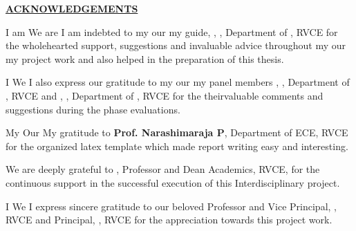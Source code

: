 \thispagestyle{empty}
\ifIDP \vspace{-1cm}\fi
\begin{center}
	\Large\textbf{\underline{ACKNOWLEDGEMENTS}} \par
\end{center}

\ifPG I am \else
\ifStuNameBUsed We are \else I am \fi\fi indebted to \ifPG my \else\ifStuNameBUsed our \else my \fi\fi guide, \textbf{\printGuideNameA}, \printGuideDesigA, Department of \printGuideDeptAInSF, RVCE for the wholehearted support, suggestions and invaluable advice throughout \ifPG my \else\ifStuNameBUsed our \else my \fi\fi project work and also helped in the preparation of this thesis.\\ \par

\ifPG I \else \ifStuNameBUsed We \else I \fi\fi also express our gratitude to \ifPG my \else\ifStuNameBUsed our \else my \fi\fi  panel member\ifIDP\space\else s \fi\textbf{\printPanelMemberA}, \printPanelMemberDesigA, Department of \printPanelMemberDeptAInSF, RVCE \ifIDP \else and \textbf{\printPanelMemberB}, \printPanelMemberDesigB , Department of \printPanelMemberDeptBInSF, RVCE \fi for \ifPanelMemBUsed the \else their\fi valuable comments and suggestions during the phase evaluations. \\ \par

\ifPG My \else \ifStuNameBUsed Our \else My \fi\fi gratitude to \textbf{Prof. Narashimaraja P}, Department of ECE, RVCE for the organized latex template which made report writing easy and interesting.\\ \par


\ifIDP
We are deeply grateful to \textbf{\printDA}, Professor and Dean Academics, RVCE, for the continuous support in the successful execution of this Interdisciplinary project.
\\ \par
\fi
\ifPG I \else \ifStuNameBUsed We \else I \fi\fi express sincere gratitude to our beloved Professor and Vice Principal, \textbf{\printVicePrincipal}, RVCE and Principal, \textbf{\printPrincipal}, RVCE for the appreciation towards this project work.\\ \par

